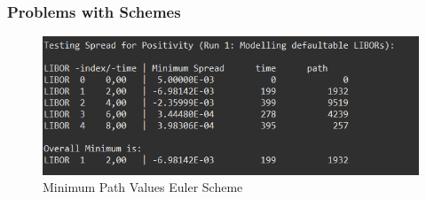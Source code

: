 \documentclass{beamer}
\begin{document}
	\begin{frame}
		\frametitle{Problems with Schemes}
		
		\begin{figure}
			\centering
			\includegraphics[width=0.7\linewidth]{VorstellungPics/ProblemsEuler}
			\caption{Minimum Path Values Euler Scheme}
			\label{fig:problemseuler}
		\end{figure}
		
		
	\end{frame}
	
\end{document}
